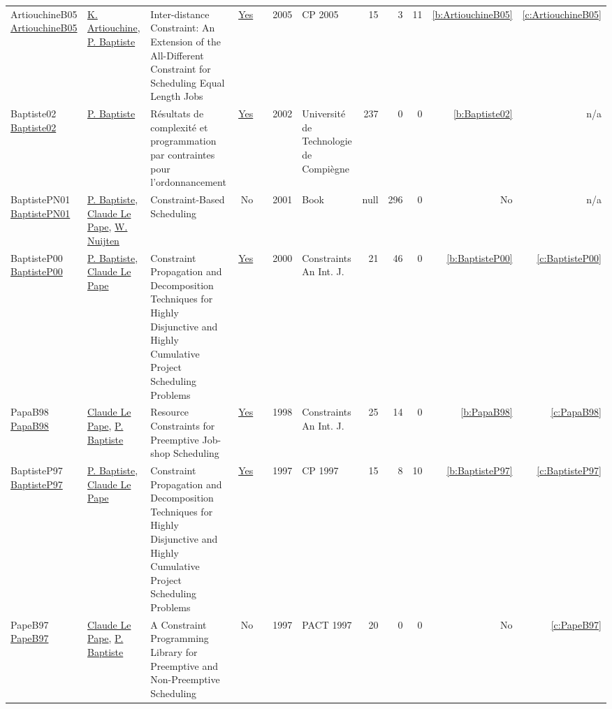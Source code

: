 {\begin{longtable}{>{\raggedright\arraybackslash}p{3cm}>{\raggedright\arraybackslash}p{6cm}>{\raggedright\arraybackslash}p{6.5cm}rrrp{2.5cm}rrrrr}
ArtiouchineB05 \href{https://doi.org/10.1007/11564751\_8}{ArtiouchineB05} & \hyperref[auth:a265]{K. Artiouchine}, \hyperref[auth:a164]{P. Baptiste} & Inter-distance Constraint: An Extension of the All-Different Constraint for Scheduling Equal Length Jobs & \href{../works/ArtiouchineB05.pdf}{Yes} & \cite{ArtiouchineB05} & 2005 & CP 2005 & 15 & 3 & 11 & \ref{b:ArtiouchineB05} & \ref{c:ArtiouchineB05}\\
Baptiste02 \href{https://theses.hal.science/tel-00124998}{Baptiste02} & \hyperref[auth:a164]{P. Baptiste} & {R{\'e}sultats de complexit{\'e} et programmation par contraintes pour l'ordonnancement} & \href{../works/Baptiste02.pdf}{Yes} & \cite{Baptiste02} & 2002 & {Universit{\'e} de Technologie de Compi{\`e}gne} & 237 & 0 & 0 & \ref{b:Baptiste02} & n/a\\
BaptistePN01 \href{http://dx.doi.org/10.1007/978-1-4615-1479-4}{BaptistePN01} & \hyperref[auth:a164]{P. Baptiste}, \hyperref[auth:a165]{Claude Le Pape}, \hyperref[auth:a666]{W. Nuijten} & Constraint-Based Scheduling & No & \cite{BaptistePN01} & 2001 & Book & null & 296 & 0 & No & n/a\\
BaptisteP00 \href{https://doi.org/10.1023/A:1009822502231}{BaptisteP00} & \hyperref[auth:a164]{P. Baptiste}, \hyperref[auth:a165]{Claude Le Pape} & Constraint Propagation and Decomposition Techniques for Highly Disjunctive and Highly Cumulative Project Scheduling Problems & \href{../works/BaptisteP00.pdf}{Yes} & \cite{BaptisteP00} & 2000 & Constraints An Int. J. & 21 & 46 & 0 & \ref{b:BaptisteP00} & \ref{c:BaptisteP00}\\
PapaB98 \href{https://doi.org/10.1023/A:1009723704757}{PapaB98} & \hyperref[auth:a165]{Claude Le Pape}, \hyperref[auth:a164]{P. Baptiste} & Resource Constraints for Preemptive Job-shop Scheduling & \href{../works/PapaB98.pdf}{Yes} & \cite{PapaB98} & 1998 & Constraints An Int. J. & 25 & 14 & 0 & \ref{b:PapaB98} & \ref{c:PapaB98}\\
BaptisteP97 \href{https://doi.org/10.1007/BFb0017454}{BaptisteP97} & \hyperref[auth:a164]{P. Baptiste}, \hyperref[auth:a165]{Claude Le Pape} & Constraint Propagation and Decomposition Techniques for Highly Disjunctive and Highly Cumulative Project Scheduling Problems & \href{../works/BaptisteP97.pdf}{Yes} & \cite{BaptisteP97} & 1997 & CP 1997 & 15 & 8 & 10 & \ref{b:BaptisteP97} & \ref{c:BaptisteP97}\\
PapeB97 \href{}{PapeB97} & \hyperref[auth:a165]{Claude Le Pape}, \hyperref[auth:a164]{P. Baptiste} & A Constraint Programming Library for Preemptive and Non-Preemptive Scheduling & No & \cite{PapeB97} & 1997 & PACT 1997 & 20 & 0 & 0 & No & \ref{c:PapeB97}\\
\end{longtable}
}

